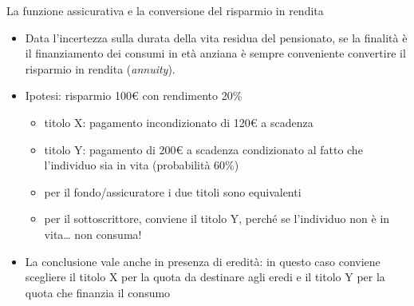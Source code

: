 \documentclass[11pt]{beamer}
\begin{document}
\begin{frame}{La funzione assicurativa e la conversione del risparmio in rendita}
\begin{itemize}
\item Data l'incertezza sulla durata della vita residua del pensionato, se la
finalità è il finanziamento dei consumi in età anziana è \alert{sempre}
conveniente convertire il risparmio in rendita (\emph{annuity}).
\item Ipotesi: risparmio 100€ con rendimento 20\%
\begin{itemize}
\item titolo X: pagamento incondizionato di 120€ a scadenza
\item titolo Y: pagamento di 200€ a scadenza condizionato al fatto che
l'individuo sia in vita (probabilità 60\%)
\item per il fondo/assicuratore i due titoli sono equivalenti
\item per il sottoscrittore, conviene il titolo Y, perché se l'individuo non è
in vita\ldots{} non consuma!
\end{itemize}
\item La conclusione vale anche in presenza di eredità: in questo caso conviene
scegliere il titolo X per la quota da destinare agli eredi e il titolo Y per
la quota che finanzia il consumo
\end{itemize}
\end{frame}
\end{document}
